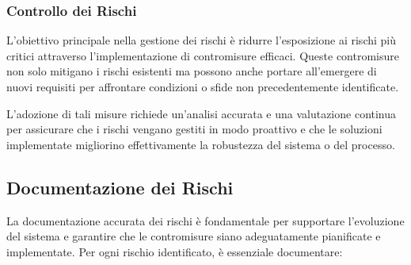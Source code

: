 \subsubsection{Controllo dei Rischi}
\begin{figure}[H]
    \centering
\end{figure}
L'obiettivo principale nella gestione dei rischi è ridurre l'esposizione ai
rischi più critici attraverso l'implementazione di contromisure efficaci. Queste
contromisure non solo mitigano i rischi esistenti ma possono anche portare all'emergere
di nuovi requisiti per affrontare condizioni o sfide non precedentemente identificate.

L'adozione di tali misure richiede un'analisi accurata e una valutazione continua per
assicurare che i rischi vengano gestiti in modo proattivo e che le soluzioni implementate
migliorino effettivamente la robustezza del sistema o del processo.
\subsection{Documentazione dei Rischi}
La documentazione accurata dei rischi è fondamentale per supportare l'evoluzione del
sistema e garantire che le contromisure siano adeguatamente pianificate e implementate.
Per ogni rischio identificato, è essenziale documentare:

